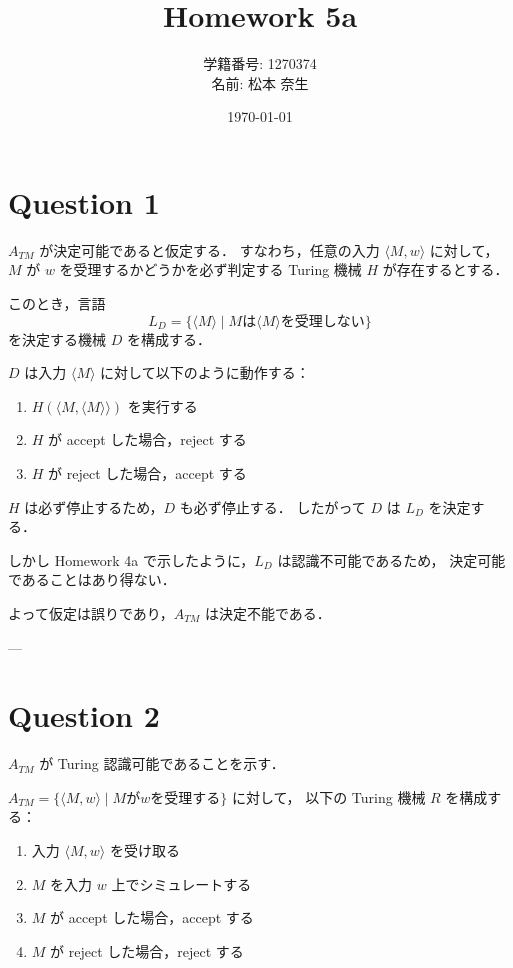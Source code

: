 \documentclass[uplatex,a4paper,11pt]{jsarticle}
\title{Homework 5a}
\author{学籍番号: 1270374 \\ 名前: 松本 奈生}
\date{\today}
\begin{document}
\maketitle

\section*{Question 1}

$A_{TM}$ が決定可能であると仮定する．
すなわち，任意の入力 $\langle M, w \rangle$ に対して，
$M$ が $w$ を受理するかどうかを必ず判定する Turing 機械 $H$ が存在するとする．

このとき，言語
\[
L_D = \{ \langle M \rangle \mid M は \langle M \rangle を受理しない \}
\]
を決定する機械 $D$ を構成する．

$D$ は入力 $\langle M \rangle$ に対して以下のように動作する：

\begin{enumerate}
    \item $H(\langle M, \langle M \rangle \rangle)$ を実行する
    \item $H$ が accept した場合，reject する
    \item $H$ が reject した場合，accept する
\end{enumerate}

$H$ は必ず停止するため，$D$ も必ず停止する．
したがって $D$ は $L_D$ を決定する．

しかし Homework 4a で示したように，$L_D$ は認識不可能であるため，
決定可能であることはあり得ない．

よって仮定は誤りであり，$A_{TM}$ は決定不能である．

---

\section*{Question 2}

$A_{TM}$ が Turing 認識可能であることを示す．

$A_{TM} = \{ \langle M, w \rangle \mid M が w を受理する \}$ に対して，
以下の Turing 機械 $R$ を構成する：

\begin{enumerate}
    \item 入力 $\langle M, w \rangle$ を受け取る
    \item $M$ を入力 $w$ 上でシミュレートする
    \item $M$ が accept した場合，accept する
    \item $M$ が reject した場合，reject する
\end{enumerate}
\end{document}
